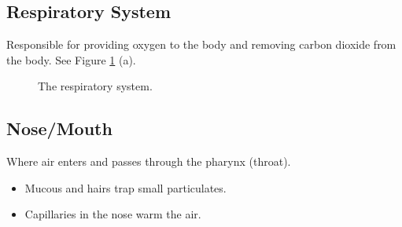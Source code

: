 \documentclass[12pt]{report}
\begin{document}
\subsection{Respiratory System}
\begin{definition}
    Responsible for providing oxygen to the body and removing carbon dioxide from the body. See Figure \ref{fig:respiratory-system} (a).
\end{definition}

\begin{figure}[!htb] 
    \centering
    \qquad
    \caption{The respiratory system.}
    \label{fig:respiratory-system}
\end{figure}

\subsection{Nose/Mouth}
\begin{definition}
    Where air enters and passes through the pharynx (throat). 
    \begin{itemize}
        \item{Mucous and hairs trap small particulates.}
        \item{Capillaries in the nose warm the air.}
    \end{itemize}
\end{definition}
\end{document}
